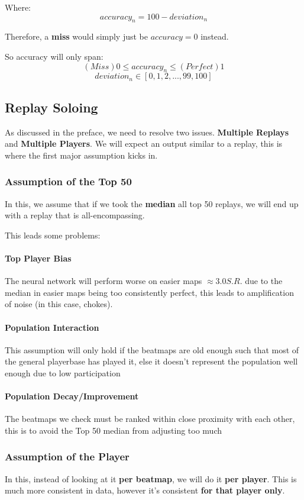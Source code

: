 Where:
$$ accuracy_n = 100 - {deviation_n} $$

Therefore, a \textbf{miss} would simply just be $accuracy = 0$ instead.

So accuracy will only span:
$$ (Miss) 0 \leq accuracy_n \leq (Perfect) 1 $$
$$ deviation_n \in [0, 1, 2, ..., 99, 100] $$

\subsection{Replay Soloing}

As discussed in the preface, we need to resolve two issues. \textbf{Multiple Replays} and \textbf{Multiple Players}. We will expect an output similar to a replay, this is where the first major assumption kicks in.

\subsubsection{Assumption of the Top 50}
In this, we assume that if we took the \textbf{median} all top 50 replays, we will end up with a replay that is all-encompassing.

This leads some problems:

\paragraph{Top Player Bias} The neural network will perform worse on easier maps $ \approx 3.0 S.R. $ due to the median in easier maps being too consistently perfect, this leads to amplification of noise (in this case, chokes).
\paragraph{Population Interaction} This assumption will only hold if the beatmaps are old enough such that most of the general playerbase has played it, else it doesn't represent the population well enough due to low participation
\paragraph{Population Decay/Improvement} The beatmaps we check must be ranked within close proximity with each other, this is to avoid the Top 50 median from adjusting too much

\subsubsection{Assumption of the Player}
In this, instead of looking at it \textbf{per beatmap}, we will do it \textbf{per player}. This is much more consistent in data, however it's consistent \textbf{for that player only}.


